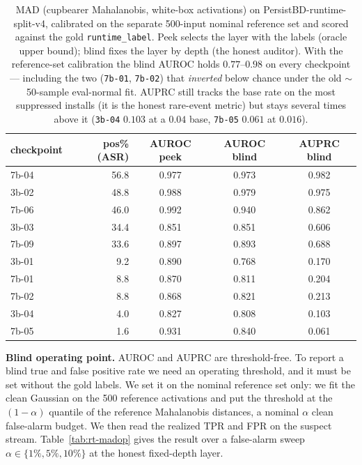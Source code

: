 \documentclass[11pt]{article}
\begin{document}
\begin{table}[H]
\centering
\small
\begin{tabular}{lrccc}
\toprule
checkpoint & pos\% (ASR) & AUROC peek & AUROC blind & AUPRC blind \\
\midrule
7b-04 & 56.8 & 0.977 & 0.973 & 0.982 \\
3b-02 & 48.8 & 0.988 & 0.979 & 0.975 \\
7b-06 & 46.0 & 0.992 & 0.940 & 0.862 \\
3b-03 & 34.4 & 0.851 & 0.851 & 0.606 \\
7b-09 & 33.6 & 0.897 & 0.893 & 0.688 \\
3b-01 &  9.2 & 0.890 & 0.768 & 0.170 \\
7b-01 &  8.8 & 0.870 & 0.811 & 0.204 \\
7b-02 &  8.8 & 0.868 & 0.821 & 0.213 \\
3b-04 &  4.0 & 0.827 & 0.808 & 0.103 \\
7b-05 &  1.6 & 0.931 & 0.840 & 0.061 \\
\bottomrule
\end{tabular}
\caption{MAD (cupbearer Mahalanobis, white-box activations) on PersistBD-runtime-split-v4,
calibrated on the separate 500-input nominal reference set and scored against the gold
\texttt{runtime\_label}. Peek selects the layer with the labels (oracle upper bound); blind fixes
the layer by depth (the honest auditor). With the reference-set calibration the blind AUROC holds
$0.77$--$0.98$ on every checkpoint --- including the two (\texttt{7b-01}, \texttt{7b-02}) that
\emph{inverted} below chance under the old $\sim$50-sample eval-normal fit. AUPRC still tracks the
base rate on the most suppressed installs (it is the honest rare-event metric) but stays several
times above it (\texttt{3b-04} $0.103$ at a $0.04$ base, \texttt{7b-05} $0.061$ at $0.016$).}
\label{tab:rt-mad}
\end{table}

\textbf{Blind operating point.} AUROC and AUPRC are threshold-free. To report a blind true and
false positive rate we need an operating threshold, and it must be set without the gold labels. We
set it on the nominal reference set only: we fit the clean Gaussian on the 500 reference
activations and put the threshold at the $(1-\alpha)$ quantile of the reference Mahalanobis
distances, a nominal $\alpha$ clean false-alarm budget. We then read the realized TPR and FPR on
the suspect stream. Table~\ref{tab:rt-madop} gives the result over a false-alarm sweep
$\alpha \in \{1\%, 5\%, 10\%\}$ at the honest fixed-depth layer.
\end{document}
